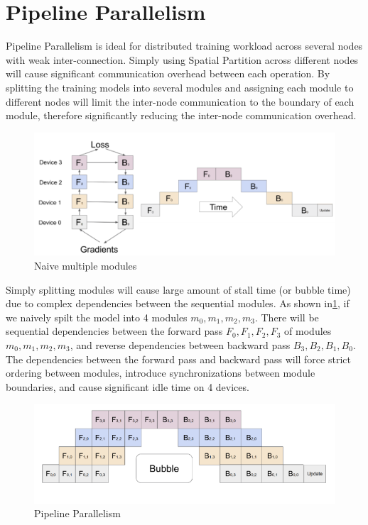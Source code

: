 \documentclass[sigplan]{acmart}\settopmatter{printfolios=true,printccs=false,printacmref=false}
\begin{document}
 \section{Pipeline Parallelism} \label{pipelineparallism}
 Pipeline Parallelism is ideal for distributed training workload across several nodes with weak inter-connection. Simply using Spatial Partition across different nodes will cause significant communication overhead between each operation. By splitting the training models into several modules and assigning each module to different nodes will limit the inter-node communication to the boundary of each module, therefore significantly reducing the inter-node communication overhead.\par
 \begin{figure}[htbp]
  \centering
  \includegraphics[scale=0.3]{NormalPipeline}
  \caption{Naive multiple modules}
  \label{fig:multiplemodule}
\end{figure}
 Simply splitting modules will cause large amount of stall time (or bubble time) due to complex dependencies between the sequential modules. As shown in\ref{fig:multiplemodule}, if we naively spilt the model into 4 modules $m_0,m_1,m_2,m_3$. There will be sequential dependencies between the forward pass $F_0, F_1, F_2, F_3$ of modules $m_0,m_1,m_2,m_3$, and reverse dependencies between backward pass $B_3, B_2, B_1, B_0$. The dependencies between the forward pass and backward pass will force strict ordering between modules, introduce synchronizations between module boundaries, and cause significant idle time on 4 devices. \par
 \begin{figure}[htbp]
  \centering
  \includegraphics[scale=0.4]{stackedpipeline}
  \caption{Pipeline Parallelism}
  \label{fig:stackedpipeline}
\end{figure}
\end{document}
